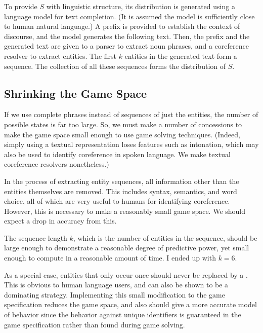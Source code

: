 \documentclass[11pt]{article}
\begin{document}
    To provide $S$ with linguistic structure,
    its distribution is generated using a language model for text completion.
    (It is assumed the model is sufficiently close to human natural language.)
    A prefix is provided to establish the context of discourse,
    and the model generates the following text.
    Then, the prefix and the generated text are given to a parser to extract noun phrases,
    and a coreference resolver to extract entities.
    The first $k$ entities in the generated text form a sequence.
    The collection of all these sequences forms the distribution of $S$.

    \subsection{Shrinking the Game Space}\label{subsec:shrinking-the-game-space}

    If we use complete phrases instead of sequences of just the entities,
    the number of possible states is far too large.
    So, we must make a number of concessions to make the game space small enough to
    use game solving techniques.
    (Indeed, simply using a textual representation loses features such as intonation,
    which may also be used to identify coreference in spoken language.
    We make textual coreference resolvers nonetheless.)

    In the process of extracting entity sequences,
    all information other than the entities themselves are removed.
    This includes syntax, semantics, and word choice,
    all of which are very useful to humans for identifying coreference.
    However, this is necessary to make a reasonably small game space.
    We should expect a drop in accuracy from this.

    The sequence length $k$, which is the number of entities in the sequence,
    should be large enough to demonstrate a reasonable degree of predictive power,
    yet small enough to compute in a reasonable amount of time.
    I ended up with $k = 6$.

    As a special case, entities that only occur once should never be replaced by a \Placeholder{}.
    This is obvious to human language users, and can also be shown to be a dominating strategy.
    Implementing this small modification to the game specification reduces the game space,
    and also should give a more accurate model of behavior since the behavior against unique identifiers
    is guaranteed in the game specification rather than found during game solving.
\end{document}
